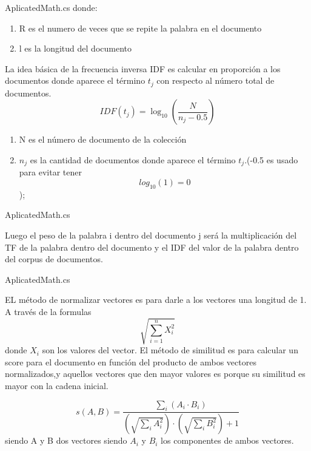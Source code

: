   \begin{frame}[fragile]{AplicatedMath.cs}
    donde:
\begin{enumerate}
    \item R es el numero de veces que se repite la palabra en el documento
    \item l es la longitud del documento
\end{enumerate}

La idea básica de la frecuencia inversa IDF es calcular en proporción a los
documentos donde aparece el t\'ermino $t_j$  con respecto al n\'umero total de
documentos.
\[ IDF(t_j)= 
\log_{10}\left(\frac{N}{n_j-0.5}\right)\]

\begin{enumerate}
  \item N es el n\'umero de documento  de la colección
  \item $n_j$ es la cantidad de documentos donde aparece el t\'ermino $t_j$.(-0.5 es usado
  para evitar tener \[log_{10}(1)=0\]);
\end{enumerate}
\end{frame}
\begin{frame}[fragile]{AplicatedMath.cs}
  
\begin{block}
  Luego el peso de la palabra i dentro del documento j será la multiplicación del
TF  de la palabra dentro del documento y el IDF del valor de la palabra dentro del
corpus de documentos.
\end{block}


\end{frame}
\begin{frame}[fragile]{AplicatedMath.cs}

EL método de normalizar vectores es para darle a los vectores una longitud de
1. A través de la formulas \[
    \sqrt{\sum_{i=1}^{n} X_i^2}
    \]
donde $X_i$ son los valores del vector.
El método de similitud es para calcular un score para el documento en  función
del producto de ambos vectores normalizados,y aquellos vectores que den
mayor valores es porque su similitud es mayor con la cadena inicial.

\[
s(A,B) = \frac{\sum_{i} (A_i \cdot B_i)}{(\sqrt{\sum_{i} A_i^2}) \cdot (\sqrt{\sum_{i} B_i^2}) + 1}
\]
siendo A y B dos vectores siendo $A_i$ y $B_i$ los componentes de ambos vectores.


\end{frame}

